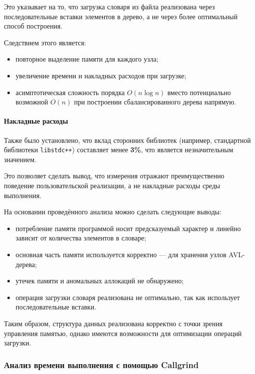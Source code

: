 \documentclass[12pt]{article}
\begin{document}
Это указывает на то, что загрузка словаря из файла реализована через последовательные вставки элементов в дерево, а не через более оптимальный способ построения.

Следствием этого является:
\begin{itemize}
	\item повторное выделение памяти для каждого узла;
	\item увеличение времени и накладных расходов при загрузке;
	\item асимптотическая сложность порядка $O(n \log n)$ вместо потенциально возможной $O(n)$ при построении сбалансированного дерева напрямую.
\end{itemize}

\paragraph{Накладные расходы}

Также было установлено, что вклад сторонних библиотек (например, стандартной библиотеки \texttt{libstdc++}) составляет менее \textbf{3\%}, что является незначительным значением.

Это позволяет сделать вывод, что измерения отражают преимущественно поведение пользовательской реализации, а не накладные расходы среды выполнения.


На основании проведённого анализа можно сделать следующие выводы:

\begin{itemize}
	\item потребление памяти программой носит предсказуемый характер и линейно зависит от количества элементов в словаре;
	\item основная часть памяти используется корректно — для хранения узлов AVL-дерева;
	\item утечек памяти и аномальных аллокаций не обнаружено;
	\item операция загрузки словаря реализована не оптимально, так как использует последовательные вставки.
\end{itemize}

Таким образом, структура данных реализована корректно с точки зрения управления памятью, однако имеются возможности для оптимизации операций загрузки.

\vspace{1\baselineskip}

\subsubsection*{Анализ времени выполнения с помощью Callgrind}
\end{document}
